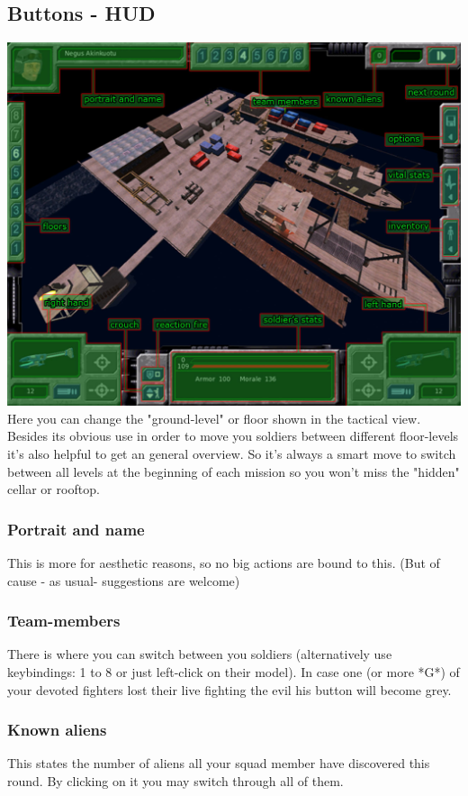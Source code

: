 \subsection{Buttons - HUD}
\includegraphics[width=\textwidth]{images/HUD_final.jpg}
Here you can change the "ground-level" or floor shown in the tactical view. Besides its obvious use in order to move you soldiers between different floor-levels it's also helpful to get an general overview. So it's always a smart move to switch between all levels at the beginning of each mission so you won't miss the "hidden" cellar or rooftop.
\subsubsection{Portrait and name}
This is more for aesthetic reasons, so no big actions are bound to this. (But of cause - as usual- suggestions are welcome)
\subsubsection{Team-members}
There is where you can switch between you soldiers (alternatively use keybindings: 1 to 8 or just left-click on their model). In case one (or more *G*) of your devoted fighters lost their live fighting the evil his button will become grey.
\subsubsection{Known aliens}
This states the number of aliens all your squad member have discovered this round. By clicking on it you may switch through all of them.
